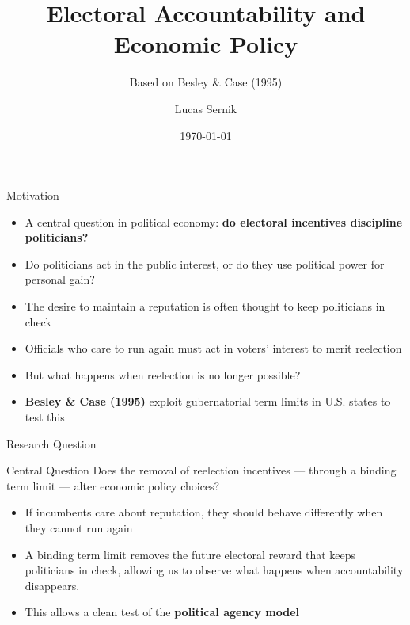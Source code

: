 \documentclass{beamer}
\title[Electoral Accountability]{Electoral Accountability and Economic Policy}
\subtitle{Based on Besley \& Case (1995)}
\author{Lucas Sernik}
\date{\today}
\begin{document}
\begin{frame}
\titlepage
\end{frame}

\begin{frame}{Motivation}
\begin{itemize}
    \item A central question in political economy: \textbf{do electoral incentives discipline politicians?}
    \vspace{0.3em}
    \item Do politicians act in the public interest, or do they use political power for personal gain?
    \vspace{0.3em}
    \item The desire to maintain a reputation is often thought to keep politicians in check
    \vspace{0.3em}
    \item Officials who care to run again must act in voters' interest to merit reelection
    \vspace{0.3em}
    \item But what happens when reelection is no longer possible?
    \vspace{0.3em}
    \item \textbf{Besley \& Case (1995)} exploit gubernatorial term limits in U.S. states to test this
\end{itemize}
\end{frame}

\begin{frame}{Research Question}
\begin{block}{Central Question}
Does the removal of reelection incentives --- through a binding term limit --- alter economic policy choices?
\end{block}
\vspace{1em}
\begin{itemize}
    \item If incumbents care about reputation, they should behave differently when they cannot run again
    \vspace{0.5em}
    \item A binding term limit removes the future electoral reward that keeps politicians in check, allowing us to observe what happens when accountability disappears.
    \vspace{0.5em}
    \item This allows a clean test of the \textbf{political agency model}
\end{itemize}
\end{frame}
\end{document}

